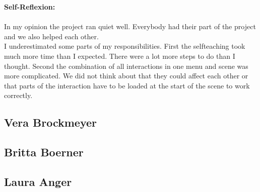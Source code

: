 \textbf{Self-Reflexion:}\\ \\
In my opinion the project ran quiet well. Everybody had their part of the project and we also helped each other.\\
I underestimated some parts of my responsibilities. First the selfteaching took much more time than I expected. There were a lot more steps to do than I thought. Second the combination of all interactions in one menu and scene was more complicated. We did not think about that they could affect each other or that parts of the interaction have to be loaded at the start of the scene to work correctly.\\

\newpage
\subsection{Vera Brockmeyer} \label{sec:SAVera}

\subsection{Britta Boerner} \label{sec:SABritta}

\newpage
\subsection{Laura Anger} \label{sec:SALaura}

